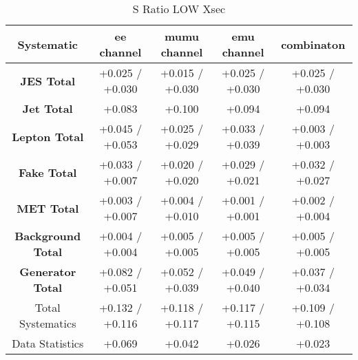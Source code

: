 \begin{table}[htbp]
\scriptsize
  \begin{center} 
  \begin{tabular}{|c|c|c|c|c|}
  \hline
       Systematic                            &  ee channel&  mumu channel&  emu channel&  combinaton\\
 \hline
\textbf{JES Total}                    &+0.025   / +0.030   & +0.015   / +0.030   & +0.025   / +0.030   & +0.025   / +0.030  \\
\textbf{Jet Total}                    &+0.083              & +0.100              & +0.094              & +0.094             \\
\textbf{Lepton Total}                 &+0.045   / +0.053   & +0.025   / +0.029   & +0.033   / +0.039   & +0.003   / +0.003  \\
\textbf{Fake Total}                   &+0.033   / +0.007   & +0.020   / +0.020   & +0.029   / +0.021   & +0.032   / +0.027  \\
\textbf{MET Total}                    &+0.003   / +0.007   & +0.004   / +0.010   & +0.001   / +0.001   & +0.002   / +0.004  \\
\textbf{Background Total}             &+0.004   / +0.004   & +0.005   / +0.005   & +0.005   / +0.005   & +0.005   / +0.005  \\
\textbf{Generator Total}              &+0.082   / +0.051   & +0.052   / +0.039   & +0.049   / +0.040   & +0.037   / +0.034  \\
  \hline
  \hline
Total Systematics                     &+0.132   / +0.116   & +0.118   / +0.117   & +0.117   / +0.115   & +0.109   / +0.108  \\
Data Statistics                       &+0.069              & +0.042              & +0.026              & +0.023             \\
  \hline
  \end{tabular}
  \end{center} 
  \label{tab:xsec_nominal_sratio_low}
  \caption{S Ratio LOW Xsec}
\end{table}


